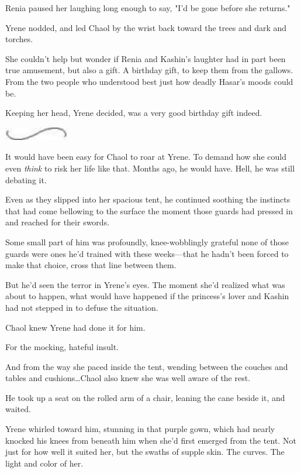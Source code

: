 Renia paused her laughing long enough to say, "I'd be gone before she returns."

Yrene nodded, and led Chaol by the wrist back toward the trees and dark and torches.

She couldn't help but wonder if Renia and Kashin's laughter had in part been true amusement, but also a gift.
A birthday gift, to keep them from the gallows.
From the two people who understood best just how deadly Hasar's moods could be.

Keeping her head, Yrene decided, was a very good birthday gift indeed.

\begin{center}
	\includegraphics[width=1.12in,height=0.24in]{images/seperator}
\end{center}

It would have been easy for Chaol to roar at Yrene.
To demand how she could even \emph{think} to risk her life like that.
Months ago, he would have.
Hell, he was still debating it.

Even as they slipped into her spacious tent, he continued soothing the instincts that had come bellowing to the surface the moment those guards had pressed in and reached for their swords.

Some small part of him was profoundly, knee-wobblingly grateful none of those guards were ones he'd trained with these weeks---that he hadn't been forced to make that choice, cross that line between them.

But he'd seen the terror in Yrene's eyes.
The moment she'd realized what was about to happen, what would have happened if the princess's lover and Kashin had not stepped in to defuse the situation.

Chaol knew Yrene had done it for him.

For the mocking, hateful insult.

And from the way she paced inside the tent, wending between the couches and tables and cushions\ldots Chaol also knew she was well aware of the rest.

He took up a seat on the rolled arm of a chair, leaning the cane beside it, and waited.

Yrene whirled toward him, stunning in that purple gown, which had nearly knocked his knees from beneath him when she'd first emerged from the tent.
Not just for how well it suited her, but the swaths of supple skin.
The curves.
The light and color of her.

